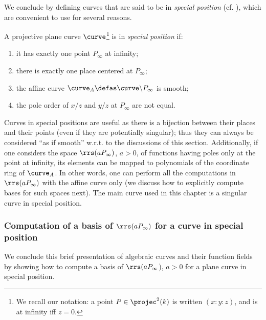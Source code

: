 We conclude by defining curves that are said to be in \emph{special position} (cf. \eg \cite{DBLP:journals/tit/SaintsH95}), which are convenient to use for several reasons.

\begin{defi}
A projective plane curve $\curve$\footnote{We recall our notation: a point $P \in \projec^2(k)$ is written $(x : y : z)$, and is
at infinity iff $z = 0$.} is in \emph{special position} if:
\begin{enumerate}
\item it has exactly one point $P_\infty$ at infinity;
\item there is exactly one place centered at $P_\infty$;
\item the affine curve $\curve_A \defas \curve\backslash P_\infty$ is smooth;
\item the pole order of $x/z$ and $y/z$ at $P_\infty$ are not equal.
\end{enumerate}
\end{defi}

Curves in special positions are useful as there is a bijection between their places and their points (even if they are potentially singular); thus they can always be considered
``as if smooth'' w.r.t. to the discussions of this section. Additionally, if one considers the space $\rrs(aP_\infty)$, $a > 0$, of functions having poles only at the point at infinity,
its elements can be mapped to polynomials of the coordinate ring of $\curve_A$. In other words, one can perform all the computations in $\rrs(aP_\infty)$ with the affine curve
only (we discuss how to explicitly compute bases for such spaces next). The main curve used in this chapter is a singular curve in special position.

\subsubsection{Computation of a basis of $\rrs(aP_\infty)$ for a curve in special position}

We conclude this brief presentation of algebraic curves and their function fields by showing how to compute a basis of $\rrs(aP_\infty$), $a > 0$
for a plane curve in special position.

